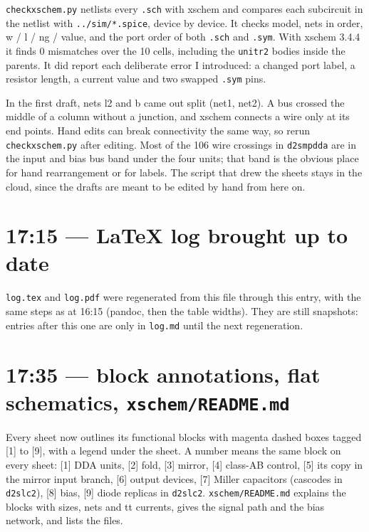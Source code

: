 \documentclass[11pt,a4paper]{article}
\renewcommand{\_}{\textunderscore\hspace{0pt}}
\begin{document}
\texttt{check\_xschem.py} netlists every
\texttt{.sch} with xschem and compares each
subcircuit in the netlist with
\texttt{../sim/*.spice}, device by device. It
checks model, nets in order, w / l / ng / value,
and the port order of both \texttt{.sch} and
\texttt{.sym}. With xschem 3.4.4 it finds 0
mismatches over the 10 cells, including the
\texttt{unit\_r2} bodies inside the parents. It
did report each deliberate error I introduced: a
changed port label, a resistor length, a current
value and two swapped \texttt{.sym} pins.

In the first draft, nets l2 and b came out split
(net1, net2). A bus crossed the middle of a column
without a junction, and xschem connects a wire
only at its end points. Hand edits can break
connectivity the same way, so rerun
\texttt{check\_xschem.py} after editing. Most of
the 106 wire crossings in \texttt{d2s\_mpdda} are
in the input and bias bus band under the four
units; that band is the obvious place for hand
rearrangement or for labels. The script that drew
the sheets stays in the cloud, since the drafts
are meant to be edited by hand from here on.

\hypertarget{1715--latex-log-brought-up-to-date}{%
\section{17:15 --- LaTeX log brought up to
date}\label{1715--latex-log-brought-up-to-date}}

\texttt{log.tex} and \texttt{log.pdf} were
regenerated from this file through this entry,
with the same steps as at 16:15 (pandoc, then the
table widths). They are still snapshots: entries
after this one are only in \texttt{log.md} until
the next regeneration.

\hypertarget{1735--block-annotations-flat-schematics-xschemreadmemd}{%
\section{\texorpdfstring{17:35 --- block
annotations, flat schematics,
\texttt{xschem/README.md}}{17:35 --- block annotations, flat schematics, xschem/README.md}}\label{1735--block-annotations-flat-schematics-xschemreadmemd}}

Every sheet now outlines its functional blocks
with magenta dashed boxes tagged {[}1{]} to
{[}9{]}, with a legend under the sheet. A number
means the same block on every sheet: {[}1{]} DDA
units, {[}2{]} fold, {[}3{]} mirror, {[}4{]}
class-AB control, {[}5{]} its copy in the mirror
input branch, {[}6{]} output devices, {[}7{]}
Miller capacitors (cascodes in \texttt{d2s\_lc2}),
{[}8{]} bias, {[}9{]} diode replicas in
\texttt{d2s\_lc2}. \texttt{xschem/README.md}
explains the blocks with sizes, nets and tt
currents, gives the signal path and the bias
network, and lists the files.
\end{document}
